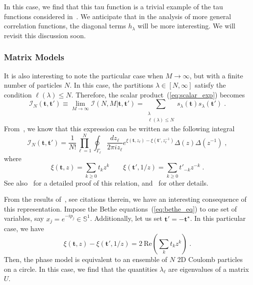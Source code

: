 \documentclass[a4paper,11pt]{amsart}
\begin{document}
In this case, we find that this tau function is a trivial example of
the tau functions considered in~\cite{orlov:2001}. We anticipate that
in the analysis of more general correlation functions, the diagonal
terms \(h_\lambda\) will be more interesting. We will revisit this
discussion soon.


\subsubsection{Matrix Models}
It is also interesting to note the particular case when \(M\to
\infty\), but with a finite number of particles \(N\). In this case,
the partitions \(\lambda \in [N, \infty]\) satisfy the condition
\(\ell(\lambda) \leq N\). Therefore, the scalar
product~(\ref{eq:scalar_exp}) becomes
\begin{equation}
  \mathcal{I}_N(\bm{t}, \bm{t}')\equiv 
  \lim_{M\to \infty}\mathcal{I}(N, M|\bm{t}, \bm{t}')
  = \sum_{\substack{\lambda \\ \ell(\lambda) \leq N}} s_\lambda(\bm{t})  s_\lambda(\bm{t}') \; .
\end{equation}
From~\cite{Zabrodin:2010ii}, we know that this expression can be
written as the following integral
\begin{equation}
  \mathcal{I}_N(\bm{t}, \bm{t}') =
  \frac{1}{N!} \prod_{\ell=1}^N \oint_{\Gamma_\ell} \frac{dz_\ell}{2 \pi i z_\ell}
  e^{\xi(\bm{t}, z_\ell) - \xi(\bm{t}', z_{\ell}^{-1})} \Delta(z)\Delta(z^{-1})\; ,
\end{equation}
where
\begin{equation}
\xi(\bm{t}, z) = \sum_{k\geq 0} t_k z^k \qquad
\xi(\bm{t}', 1/z) = \sum_{k\geq 0} t'_{-k} z^{-k} \; . 
\end{equation}
See also~\cite{Kharchev:1991gd} for a detailed proof of this relation,
and~\cite{Orlov:2005} for other details. 

From the results of~\cite{Zabrodin:2010ii}, see citations therein, we
have an interesting consequence of this representation. Impose the
Bethe equations~(\ref{eq:bethe_eq}) to one set of variables, say \(x_j
= e^{-ip_j} \in \mathbb{S}^1\). Additionally, let us set \(\bm{t}' = -
\bm{t}^\star\). In this particular case, we have
\begin{equation}
\xi(\bm{t}, z) - \xi(\bm{t}', 1/z)  = 2 \ \textrm{Re}\left(\sum_k t_k z^k\right)\; .
\end{equation}
Then, the phase model is equivalent to an ensemble of \(N\) 2D Coulomb
particles on a circle. In this case, we find that the quantities
\(\lambda_{\ell}\) are eigenvalues of a matrix \(U\).
\end{document}
